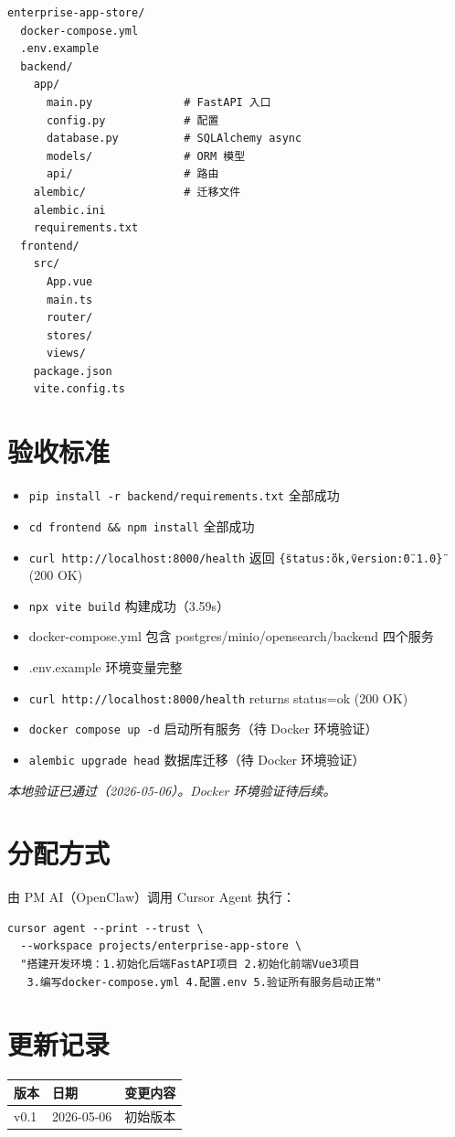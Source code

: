 \documentclass[11pt,a4paper]{article}
\begin{document}
\begin{lstlisting}[basicstyle=\ttfamily\footnotesize, frame=single]
enterprise-app-store/
  docker-compose.yml
  .env.example
  backend/
    app/
      main.py              # FastAPI 入口
      config.py            # 配置
      database.py          # SQLAlchemy async
      models/              # ORM 模型
      api/                 # 路由
    alembic/               # 迁移文件
    alembic.ini
    requirements.txt
  frontend/
    src/
      App.vue
      main.ts
      router/
      stores/
      views/
    package.json
    vite.config.ts
\end{lstlisting}

\section{验收标准}

\begin{itemize}
  \item[\checkmark] \texttt{pip install -r backend/requirements.txt} 全部成功
  \item[\checkmark] \texttt{cd frontend \&\& npm install} 全部成功
  \item[\checkmark] \texttt{curl http://localhost:8000/health} 返回 \texttt{\{\"status\":\"ok\",\"version\":\"0.1.0\"\}} (200 OK)
  \item[\checkmark] \texttt{npx vite build} 构建成功（3.59s）
  \item[\checkmark] docker-compose.yml 包含 postgres/minio/opensearch/backend 四个服务
  \item[\checkmark] .env.example 环境变量完整
  \item[\checkmark] \texttt{curl http://localhost:8000/health} returns status=ok (200 OK)
  \item[$\square$] \texttt{docker compose up -d} 启动所有服务（待 Docker 环境验证）
  \item[$\square$] \texttt{alembic upgrade head} 数据库迁移（待 Docker 环境验证）
\end{itemize}

\vspace{1em}
\textit{本地验证已通过（2026-05-06）。Docker 环境验证待后续。}

\section{分配方式}

由 PM AI（OpenClaw）调用 Cursor Agent 执行：

\begin{lstlisting}[basicstyle=\ttfamily\footnotesize, frame=single]
cursor agent --print --trust \
  --workspace projects/enterprise-app-store \
  "搭建开发环境：1.初始化后端FastAPI项目 2.初始化前端Vue3项目
   3.编写docker-compose.yml 4.配置.env 5.验证所有服务启动正常"
\end{lstlisting}

\section*{更新记录}

\begin{tabular}{lll}
\toprule
版本 & 日期 & 变更内容 \\
\midrule
v0.1 & 2026-05-06 & 初始版本 \\
\bottomrule
\end{tabular}
\end{document}
